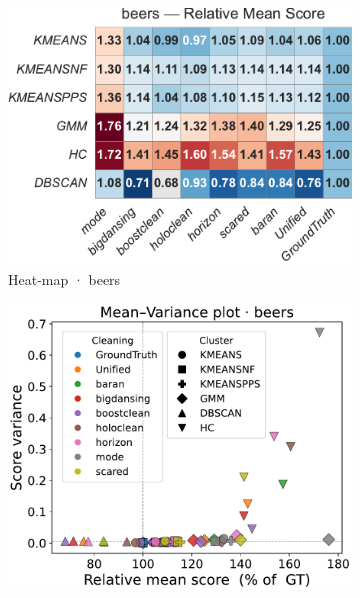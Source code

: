 \documentclass[10pt]{article} %
\numberwithin{equation}{section}
\begin{document}
\begin{figure}[htbp]
  \centering
  \footnotesize
  \setlength{\abovecaptionskip}{4pt}
  \setlength{\belowcaptionskip}{0pt}

  \begin{subfigure}{0.33\linewidth}
    \centering
    \includegraphics[width=\linewidth]{figures/5.3.1graph/heatmap_rel_beers.pdf}
    \caption{Heat-map · beers}
  \end{subfigure}\hfill
  \begin{subfigure}{0.32\linewidth}
    \centering
    \includegraphics[width=\linewidth]{figures/5.3.1graph/mean_var_scatter_beers.pdf}

\end{subfigure}
\end{figure}
\end{document}
